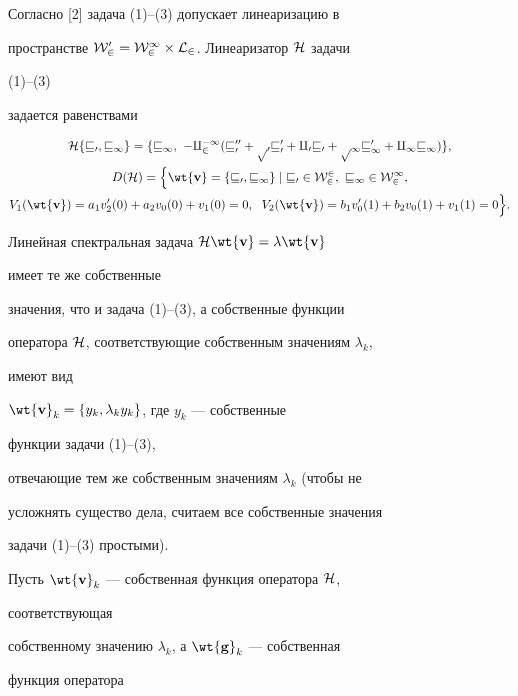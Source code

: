  


Согласно [2] задача (1)--(3) допускает линеаризацию в  


пространстве $\cal W^0_2=W^1_2\times L_2$. Линеаризатор $\cal H$ задачи 


(1)--(3) 


задается равенствами 


\begin{gather*} 


\cal H\{v_0,v_1\}=\{v_1,\ -q^{-1}_2(v_0''+p_0v'_0+ 


q_0v_0+p_1v'_1+q_1v_1)\}, \\


% 


D(\cal H)=\Big\{\wt{\bold v}=\{v_0,v_1\}\mid v_0\in W^2_2, 


\ v_1\in W^1_2, \\ 


% 


V_1(\wt{\bold v})=a_1v'_2(0)+a_2v_0(0)+v_1(0)=0,\ \;


V_2(\wt{\bold v})=b_1v'_0(1)+ 


b_2v_0(1)+v_1(1)=0\Big\}. 


\end{gather*} 


Линейная спектральная задача $\cal H\wt{\bold v}=\lambda\wt{\bold v}$ 


имеет те же собственные  


значения, что и задача (1)--(3), а собственные функции 


оператора $\cal H$, соответствующие собственным значениям $\lambda_k$, 


имеют вид  


$\wt{\bold v}_k=\{y_k,\lambda_k y_k\}$, где $y_k$ --- собственные 


функции задачи (1)--(3), 


отвечающие тем же собственным значениям $\lambda_k$ (чтобы не  


усложнять существо дела, считаем все собственные значения  


задачи (1)--(3) простыми). 


 


Пусть $\wt{\bold v}_k$ --- собственная функция оператора $\cal H$, 


соответствующая  


собственному значению $\lambda_k$, а $\wt{\bold g}_k$ --- собственная 


функция оператора  


